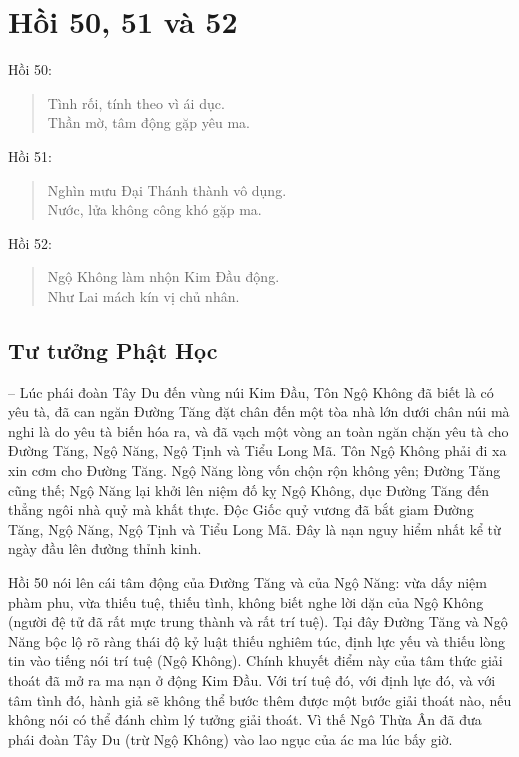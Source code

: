 \chapter{Hồi 50, 51 và 52} %
\label{cha:hoi_50_51}

Hồi 50:

\begin{verse}
\begin{itshape}
Tình rối, tính theo vì ái dục.\\
Thần mờ, tâm động gặp yêu ma.
\end{itshape}
\end{verse}

Hồi 51:

\begin{verse}
\begin{itshape}
Nghìn mưu Đại Thánh thành vô dụng.\\
Nước, lửa không công khó gặp ma.
\end{itshape}
\end{verse}

Hồi 52:

\begin{verse}
\begin{itshape}
Ngộ Không làm nhộn Kim Đầu động.\\
Như Lai mách kín vị chủ nhân.
\end{itshape}
\end{verse}

\section{Tư tưởng Phật Học} %
\label{sec:50_51_phat_hoc}

-- Lúc phái đoàn Tây Du đến vùng núi Kim Đầu, Tôn Ngộ Không đã biết là có yêu tà, đã can ngăn Đường Tăng đặt chân đến một tòa nhà lớn dưới chân núi mà nghi là do yêu tà biến hóa ra, và đã vạch một vòng an toàn ngăn chặn yêu tà cho Đường Tăng, Ngộ Năng, Ngộ Tịnh và Tiểu Long Mã. Tôn Ngộ Không phải đi xa xin cơm cho Đường Tăng. Ngộ Năng lòng vốn chộn rộn không yên; Đường Tăng cũng thế; Ngộ Năng lại khởi lên niệm đố kỵ Ngộ Không, dục Đường Tăng đến thẳng ngôi nhà quỷ mà khất thực. Độc Giốc quỷ vương đã bắt giam Đường Tăng, Ngộ Năng, Ngộ Tịnh và Tiểu Long Mã. Đây là nạn nguy hiểm nhất kể từ ngày đầu lên đường thỉnh kinh.

Hồi 50 nói lên cái tâm động của Đường Tăng và của Ngộ Năng: vừa dấy niệm phàm phu, vừa thiếu tuệ, thiếu tình, không biết nghe lời dặn của Ngộ Không (người đệ tử đã rất mực trung thành và rất trí tuệ). Tại đây Đường Tăng và Ngộ Năng bộc lộ rõ ràng thái độ kỷ luật thiếu nghiêm túc, định lực yếu và thiếu lòng tin vào tiếng nói trí tuệ (Ngộ Không). Chính khuyết điểm này của tâm thức giải thoát đã mở ra ma nạn ở động Kim Đầu. Với trí tuệ đó, với định lực đó, và với tâm tình đó, hành giả sẽ không thể bước thêm được một bước giải thoát nào, nếu không nói có thể đánh chìm lý tưởng giải thoát. Vì thế Ngô Thừa Ân đã đưa phái đoàn Tây Du (trừ Ngộ Không) vào lao ngục của ác ma lúc bấy giờ.

